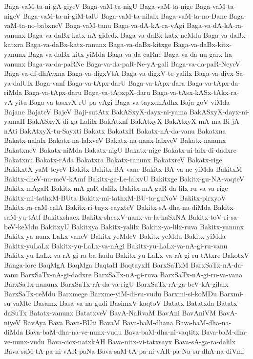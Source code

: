 {Baga-vaM-ta-ni-gA-giyeV
Baga-vaM-ta-nigU
Baga-vaM-ta-nige
Baga-vaM-ta-nigeV
Baga-vaM-ta-ni-giM-talU
Baga-vaM-ta-nilalx
Baga-vaM-ta-no-Dane
Baga-vaM-ta-no-babxneV
Baga-vaM-tanu
Baga-va-dA-kA-ra-vAgi
Baga-va-dA-kA-ra-vanunx
Baga-va-daBx-katx-nA-gidedx
Baga-va-daBx-katx-neMdu
Baga-va-daBx-katxra
Baga-va-daBx-katx-ranunx
Baga-va-daBx-kitxge
Baga-va-daBx-kitx-yanunx
Baga-va-daBx-kitx-yiMda
Baga-va-da-caRne
Baga-va-da-nu-garx-ha-vanunx
Baga-va-da-paRNe
Baga-va-da-paR-Ne-yA-gali
Baga-va-da-paR-NeyeV
Baga-va-df-dhAyxna
Baga-va-digxVtA
Baga-va-digxV-te-yalilx
Baga-va-divx-Sa-ya-dalUlx
Baga-vanf
Baga-va-tApx-darU
Baga-va-tApx-dara
Baga-va-tApx-da-riMda
Baga-va-tApx-daru
Baga-va-tApxpX-daru
Baga-va-tAsx-kASx-tAkx-ra-vA-yitu
Baga-va-tasxvX-rU-pa-vAgi
Baga-va-tayxdhAdhx
Baja-goV-viMda
Bajane
BajateV
BajeV
Baji-sutAtx
BakASxyX-dayx-ni-yama
BakASxyX-dayx-ni-yamaH
BakASxyX-di-ga-Lalilx
BakAtxnf
BakAtxyX
BakAtxyX-mA-ma-Bi-jA-nAti
BakAtxyX-tu-Sayxti
Bakatx
BakatxH
Bakatx-nA-da-vanu
Bakatxna
Bakatx-nalalx
Bakatx-na-lalxveV
Bakatx-na-nanx-lalxveV
Bakatx-nanunx
BakatxneV
Bakatx-niMda
Bakatx-nigU
Bakatx-nige
Bakatx-ni-lalx-di-dadxre
Bakatxnu
Bakatx-rAda
Bakatxra
Bakatx-ranunx
BakatxreV
Bakatx-rige
BakikxtX-yaM-teyeV
Bakitx
Bakitx-BA-vane
Bakitx-BA-va-ne-yiMda
BakitxM
Bakitx-dheV-nu-meV-kAmf
Bakitx-ga-Le-lalxvU
Bakitxge
Bakitx-gu-NA-vaqteV
Bakitx-mAgaR
Bakitx-mA-gaR-dalilx
Bakitx-mA-gaR-da-lilx-ru-va-va-rige
Bakitx-mi-tathxM-BUta
Bakitx-mi-tathxM-BU-ta-guNoV
Bakitx-pirxyoV
Bakitx-ra-caM-calA
Bakitx-ri-tuyx-cayxteV
Bakitx-sA-dha-na-diMda
Bakitx-saM-yu-tAtf
Bakitxshacx
Bakitx-shecxV-nanx-va-la-kaSxNA
Bakitx-toV-ri-sa-beV-keMdu
BakitxyU
Bakitxya
Bakitx-yalilx
Bakitx-ya-lilx-ruva
Bakitx-yanunx
Bakitx-ya-nunx-LaLx-vaneV
Bakitx-yeMdeV
Bakitx-yeMdu
Bakitx-yiMda
Bakitx-yuLaLx
Bakitx-yu-LaLx-va-nAgi
Bakitx-yu-LaLx-va-nA-gi-ru-vanu
Bakitx-yu-LaLx-va-rA-gi-ra-ba-hudu
Bakitx-yu-LaLx-va-rA-gi-ru-tAtxre
BakotxV
Banga-lore
BaqMgA
BaqMga
BaqtaH
BaqtayxH
BarxSaTxM
BarxSaTx-nA-da-vanu
BarxSaTx-nA-gi-dadxre
BarxSaTx-nA-gi-ruva
BarxSaTx-nA-gi-ru-va-vana
BarxSaTx-nanunx
BarxSaTx-rA-da-va-rigU
BarxSaTx-rA-ga-beV-kA-gilalx
BarxSaTx-reMdu
Barxmege
Barxme-yiM-di-ru-vudu
Barxmi-si-koMDu
Barxmi-su-vaMte
Basamx
Basa-va-na-gudi
BasimxV-kaqtoV
Batatx
Batatxda
Batatx-daSuTx
Batatx-vanunx
BatatxveV
BavA-NaRvaM
BavAni
BavAniVM
BavA-niyeV
BavAya
Bava
Bava-BUti
BavaM
Bava-baM-dhana
Bava-baM-dha-na-diMda
Bava-baM-dha-na-ve-nunx-vudu
Bava-baM-dha-ni-vaqtitx
Bava-baM-dha-ve-nunx-vudu
Bava-cicx-natxkAH
Bava-nitx-vi-tatxsayx
Bava-sA-ga-ra-dalilx
Bava-saM-tA-pa-ni-vAR-paNa
Bava-saM-tA-pa-ni-vAR-pa-Na-su-dhA-na-diVmf
}
